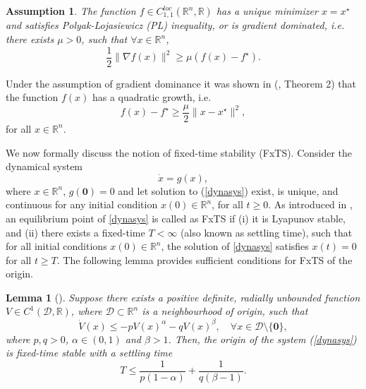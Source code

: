 \documentclass[letterpaper]{article}
\newtheorem{lemma}{Lemma} %
\newtheorem{assumption}{Assumption}
\begin{document}
\begin{assumption} \label{plineq}
The function $f\in C_{1,1}^{loc}(\mathbb{R}^n, \mathbb{R})$ has a unique minimizer $x=x^\star$ and satisfies Polyak-Lojasiewicz (PL) inequality, or is gradient dominated, i.e. there exists $\mu>0$, such that $\forall x\in \mathbb{R}^n$,
\begin{equation} \label{grad_dom}
\frac{1}{2}\|\nabla f(x)\|^2 \geq \mu(f(x)-f^\star).
\end{equation}
\end{assumption}
Under the assumption of gradient dominance it was shown in (\cite{karimi2016linear}, Theorem 2) that the function $f(x)$ has a quadratic growth, i.e.
\begin{equation} \label{quadgrowth}
f(x)-f^\star \geq \frac{\mu}{2}\|x-x^\star\|^2,
\end{equation}
for all $x\in \mathbb{R}^n$.

We now formally discuss the notion of fixed-time stability (FxTS). Consider the dynamical system
\begin{equation} \label{dynasys}
\dot{x}=g(x),
\end{equation}
where $x\in \mathbb{R}^n$, $g(\bm{0})=0$ and let solution to (\ref{dynasys}) exist, is unique, and continuous for any initial condition $x(0)\in \mathbb{R}^n$, for all $t\geq 0$. As introduced in \cite{polyakov2011nonlinear}, an equilibrium point of \eqref{dynasys} is called as FxTS if (i) it is Lyapunov stable, and (ii) there exists a fixed-time $T<\infty$ (also known as settling time), such that for all initial conditions $x(0)\in\mathbb R^n$, the solution of \eqref{dynasys} satisfies $x(t)\!=\!0$ for all $t\geq T$. The following lemma provides sufficient conditions for FxTS of the origin.

\begin{lemma}[\cite{polyakov2011nonlinear}] \label{fxts_lemma}
Suppose there exists a positive definite, radially unbounded function $V\in C^1(\mathcal{D},\mathbb{R})$, where $\mathcal{D}\subset \mathbb{R}^n$ is a neighbourhood of origin, such that
\begin{equation}\label{eq:dotV cond}
\dot{V}(x)\leq -pV(x)^{\alpha} -qV(x)^{\beta}, \quad \forall x\in \mathcal{D}\setminus \{\bm{0}\},
\end{equation}
where $p,q >0$, $\alpha \in (0,1)$ and $\beta>1$. Then, the origin of the system (\ref{dynasys}) is fixed-time stable with a settling time
\begin{equation}
T \leq \frac{1}{p(1-\alpha)} + \frac{1}{q(\beta -1)} .
\end{equation}
\end{lemma}
\end{document}
